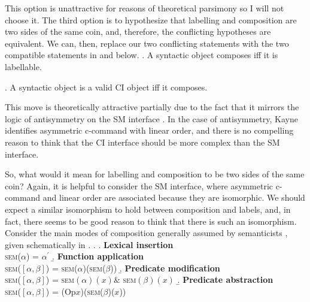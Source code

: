 \documentclass[MilwayThesis]{subfiles}
\begin{document}
This option is unattractive for reasons of theoretical parsimony so I will not choose it.
The third option is to hypothesize that labelling and composition are two sides of the same coin, and, therefore, the conflicting hypotheses are equivalent.
We can, then, replace our two conflicting statements with the two compatible statements in \Next and \NNext below.
\ex. A syntactic object composes iff it is labellable.

\ex. A syntactic object is a valid CI object iff it composes.

This move is theoretically attractive partially due to the fact that it mirrors the logic of antisymmetry on the SM interface \parencite{kayne1994antisymmetry}.
In the case of antisymmetry, Kayne identifies asymmetric c-command with linear order, and there is no compelling reason to think that the CI interface should be more complex than the SM interface.

So, what would it mean for labelling and composition to be two sides of the same coin?
Again, it is helpful to consider the SM interface, where asymmetric c-command and linear order are associated because they are isomorphic.
We should expect a similar isomorphism to hold between composition and labels, and, in fact, there seems to be good reason to think that there is such an isomorphism.
Consider the main modes of composition generally assumed by semanticists \parencite[\textit{e.g.}, by][]{heimkratzer1998semantics}, given schematically in \Next.
\ex. 
\a. \textbf{Lexical insertion}\\
\textsc{sem}($\alpha$) = $\alpha^\prime$
\b. \textbf{Function application}\\
\textsc{sem}($\left[ \alpha, \beta \right]$) = \textsc{sem}($\alpha$)(\textsc{sem}($\beta$))
\b. \textbf{Predicate modification}\\
\textsc{sem}($\left[ \alpha, \beta \right]$) = \textsc{sem}$(\alpha)(x) \&$ \textsc{sem}$(\beta)(x)$
\b. \textbf{Predicate abstraction}\\
\textsc{sem}($\left[ \alpha, \beta \right]$) = (Op$x$)(\textsc{sem}($\beta$)($x$))
\end{document}
